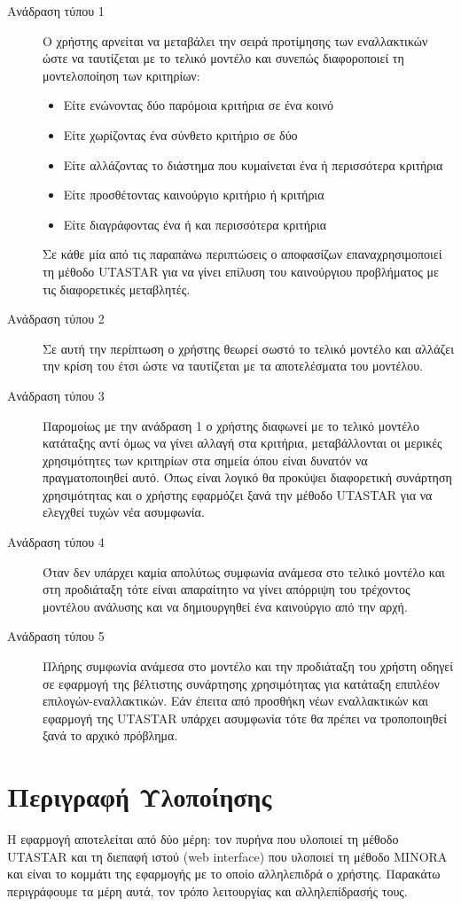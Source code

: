 \documentclass[11pt,a4paper,titlepage]{article}
\numberwithin{equation}{section}
\begin{document}
\begin{description}
	\item[Ανάδραση τύπου 1]
	Ο χρήστης αρνείται να μεταβάλει την σειρά προτίμησης των εναλλακτικών ώστε να ταυτίζεται με το τελικό μοντέλο και συνεπώς διαφοροποιεί τη μοντελοποίηση των κριτηρίων:
	\begin{itemize}
		\item Είτε ενώνοντας δύο παρόμοια κριτήρια σε ένα κοινό
		\item Είτε χωρίζοντας ένα σύνθετο κριτήριο σε δύο 
		\item Είτε αλλάζοντας το διάστημα που κυμαίνεται ένα ή περισσότερα κριτήρια
		\item Είτε προσθέτοντας καινούργιο κριτήριο ή κριτήρια
		\item Είτε διαγράφοντας ένα ή και περισσότερα κριτήρια
	\end{itemize}
	Σε κάθε μία από τις παραπάνω περιπτώσεις ο αποφασίζων επαναχρησιμοποιεί τη μέθοδο UTASTAR για να γίνει επίλυση του καινούργιου προβλήματος με τις διαφορετικές μεταβλητές.
	\item[Ανάδραση τύπου 2]
	Σε αυτή την περίπτωση ο χρήστης θεωρεί σωστό το τελικό μοντέλο και αλλάζει την κρίση του έτσι ώστε να ταυτίζεται με τα αποτελέσματα του μοντέλου.	
	\item[Ανάδραση τύπου 3]
	Παρομοίως με την ανάδραση 1 ο χρήστης διαφωνεί με το τελικό μοντέλο κατάταξης αντί όμως να γίνει αλλαγή στα κριτήρια, μεταβάλλονται οι μερικές χρησιμότητες των κριτηρίων στα σημεία όπου είναι δυνατόν να πραγματοποιηθεί αυτό. Όπως είναι λογικό θα προκύψει διαφορετική συνάρτηση χρησιμότητας και ο χρήστης εφαρμόζει ξανά την μέθοδο UTASTAR για να ελεγχθεί τυχών νέα ασυμφωνία.   
	\item[Ανάδραση τύπου 4]
	Όταν δεν υπάρχει καμία απολύτως συμφωνία ανάμεσα στο τελικό μοντέλο και στη προδιάταξη τότε είναι απαραίτητο να γίνει απόρριψη του τρέχοντος μοντέλου ανάλυσης και να δημιουργηθεί ένα καινούργιο από την αρχή.
	\item[Ανάδραση τύπου 5]
	Πλήρης συμφωνία ανάμεσα στο μοντέλο και την προδιάταξη του χρήστη οδηγεί σε εφαρμογή της βέλτιστης συνάρτησης χρησιμότητας για κατάταξη επιπλέον επιλογών-εναλλακτικών. Εάν έπειτα από προσθήκη νέων εναλλακτικών και εφαρμογή της UTASTAR υπάρχει ασυμφωνία τότε θα πρέπει να τροποποιηθεί ξανά το αρχικό πρόβλημα.
\end{description}

\section{Περιγραφή Υλοποίησης}
\label{sec:implementation}
Η εφαρμογή αποτελείται από δύο μέρη: τον πυρήνα που υλοποιεί τη μέθοδο UTASTAR και τη διεπαφή ιστού (web interface) που υλοποιεί τη μέθοδο MINORA και είναι το κομμάτι της εφαρμογής με το οποίο αλληλεπιδρά ο χρήστης. Παρακάτω περιγράφουμε τα μέρη αυτά, τον τρόπο λειτουργίας και αλληλεπίδρασής τους.
\end{document}
